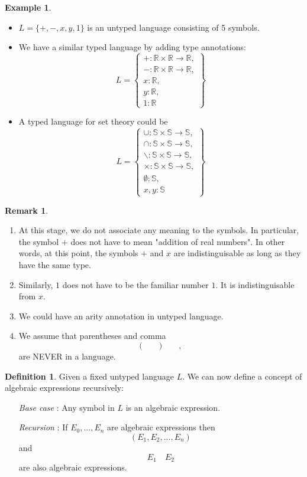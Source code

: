 \documentclass{amsart}
\theoremstyle{definition}
\newtheorem{defn}{Definition}
\newtheorem*{remark}{Remark}
\newtheorem*{example}{Example}
\newcommand{\R}{\mathbb{R}}
\renewcommand{\S}{\mathbb{S}}
\begin{document}
\begin{example}
\begin{itemize}
\item $L = \{+, -, x, y, 1\}$ is an untyped language consisting of 5 symbols.

\item We have a similar typed language by adding type annotations:
$$L = \left\{ \begin{array}{l} + : \R \times \R \rightarrow \R,\\ -: \R \times \R \rightarrow \R,\\ x : \R,\\ y : \R,\\ 1 : \R\end{array}\right\}$$

\item A typed language for set theory could be
$$L = \left\{ \begin{array}{l} \cup : \S \times \S \rightarrow \S,\\ \cap: \S \times \S \rightarrow \S,\\ \backslash : \S \times \S \rightarrow \S,\\ \times : \S \times \S \rightarrow \S, \\ \emptyset : \S, \\ x, y : \S  \end{array}\right\}$$
\end{itemize}
\end{example}

\begin{remark}
\begin{enumerate}
\item At this stage, we do not associate any meaning to the symbols. In particular, the symbol $+$ does not have to mean "addition of real numbers". In other words, at this point, the symbols $+$ and $x$ are indistinguisable as long as they have the same type.
\item Similarly, $1$ does not have to be the familiar number $1$. It is indistinguisable from $x$.
\item We could have an arity annotation in untyped language.
\item We assume that parentheses and comma
$$\mathbf{(} \qquad \mathbf{)} \qquad\mathbf{,}$$
are NEVER in a language.
\end{enumerate}
\end{remark}

\begin{defn}
Given a fixed untyped language $L$. We can now define a concept of algebraic expressions recursively:
\begin{itemize}
\item [{\it Base case}]: Any symbol in $L$ is an algebraic expression.
\item [{\it Recursion}]: If $E_0, ..., E_n$ are algebraic expressions then
$$(E_1, E_2, ..., E_n)$$
and
$$E_1 \quad E_2$$
are also algebraic expressions.
\end{itemize}
\end{defn}
\end{document}
